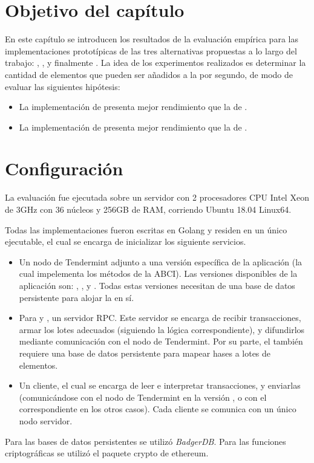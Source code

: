 \section{Objetivo del capítulo}\label{sec:benchmark}
En este capítulo se introducen los resultados de la evaluación empírica para las implementaciones
prototípicas de las tres alternativas propuestas a lo largo del trabajo: \vanilla, \compresschain,
y finalmente \hashchain.
La idea de los experimentos realizados es determinar la cantidad de elementos que pueden ser
añadidos a la \setchain por segundo, de modo de evaluar las siguientes hipótesis:
\begin{itemize}
	\item La implementación de \compresschain presenta mejor rendimiento que la de \vanilla.
	\item La implementación de \hashchain presenta mejor rendimiento que la de \compresschain.
\end{itemize}

\section{Configuración}
%
La evaluación fue ejecutada sobre un servidor con 2 procesadores CPU Intel Xeon de 3GHz
con 36 núcleos y 256GB de RAM, corriendo Ubuntu 18.04 Linux64.

%
Todas las implementaciones fueron escritas en Golang y residen en un único ejecutable, el cual se encarga
de inicializar los siguiente servicios.
\begin{itemize}
	\item Un nodo de Tendermint adjunto a una versión específica de la aplicación (la cual impelementa los métodos
	de la ABCI). Las versiones disponibles de la aplicación son: \vanilla, \compresschain, y \hashchain. Todas estas
	versiones necesitan de una base de datos persistente para alojar la \setchain en sí.
	\item Para \compresschain y \hashchain, un servidor \collector RPC. Este servidor se encarga de recibir transacciones,
	armar los lotes adecuados (siguiendo la lógica correspondiente), y difundirlos mediante comunicación con el nodo
	de Tendermint. Por su parte, el \hcollector también requiere una base de datos persistente para mapear hases a lotes
	de elementos.
	\item Un cliente, el cual se encarga de leer e interpretar transacciones, y enviarlas (comunicándose con el nodo de
	Tendermint en la versión \vanilla, o con el \collector correspondiente en los otros casos). Cada cliente se comunica
	con un único nodo servidor.
\end{itemize}
Para las bases de datos persistentes se utilizó \textit{BadgerDB}\cite{db.badger}.
Para las funciones criptográficas se utilizó el paquete crypto de ethereum. 

